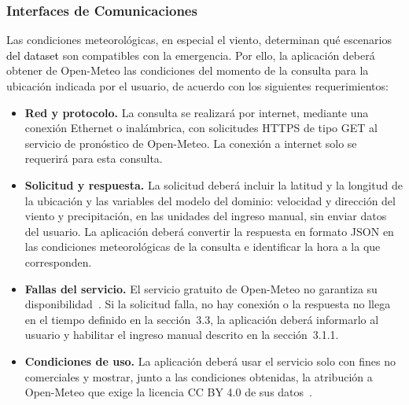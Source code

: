 \subsubsection{Interfaces de Comunicaciones}\label{sec:interfaces-comunicacion}
Las condiciones meteorológicas, en especial el viento, determinan qué escenarios \textcolor{black}{del dataset} son compatibles con la emergencia. Por ello, la aplicación deberá obtener de Open-Meteo las condiciones del momento de la consulta para la ubicación indicada por el usuario, de acuerdo con los siguientes requerimientos:

\begin{itemize}
  \item \textbf{Red y protocolo.} La consulta se realizará por internet, mediante una conexión Ethernet o inalámbrica, con solicitudes HTTPS de tipo GET al servicio de pronóstico de Open-Meteo. La conexión a internet solo se requerirá para esta consulta.
  \item \textbf{Solicitud y respuesta.} La solicitud deberá incluir la latitud y la longitud de la ubicación y las variables del modelo del dominio: velocidad y dirección del viento y precipitación, en las unidades del ingreso manual, sin enviar datos del usuario. La aplicación deberá convertir la respuesta en formato JSON en las condiciones meteorológicas de la consulta e identificar la hora a la que corresponden.
  \item \textbf{Fallas del servicio.} El servicio gratuito de Open-Meteo no garantiza su disponibilidad~\cite{openmeteoterms}. Si la solicitud falla, no hay conexión o la respuesta no llega en el tiempo definido en la sección~3.3, la aplicación deberá informarlo al usuario y habilitar el ingreso manual descrito en la sección~3.1.1.
  \item \textbf{Condiciones de uso.} La aplicación deberá usar el servicio solo con fines no comerciales y mostrar, junto a las condiciones obtenidas, la atribución a Open-Meteo que exige la licencia CC BY 4.0 de sus datos~\cite{openmeteoterms}.
\end{itemize}